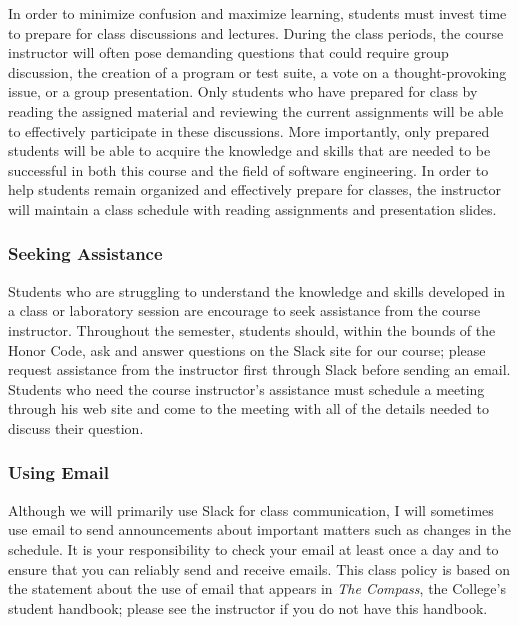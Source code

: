 \documentclass[11pt]{article}
\newcommand{\instructorpronoun}[1]{his}
\begin{document}
In order to minimize confusion and maximize learning, students must invest time to prepare for class discussions and
lectures. During the class periods, the course instructor will often pose demanding questions that could require group
discussion, the creation of a program or test suite, a vote on a thought-provoking issue, or a group presentation. Only
students who have prepared for class by reading the assigned material and reviewing the current assignments will be able
to effectively participate in these discussions. More importantly, only prepared students will be able to acquire the
knowledge and skills that are needed to be successful in both this course and the field of software engineering. In
order to help students remain organized and effectively prepare for classes, the instructor will maintain a class
schedule with reading assignments and presentation slides.

\subsubsection*{Seeking Assistance}

Students who are struggling to understand the knowledge and skills developed in a class or laboratory session are
encourage to seek assistance from the course instructor. Throughout the semester, students should, within the bounds of
the Honor Code, ask and answer questions on the Slack site for our course; please request assistance from the instructor
first through Slack before sending an email. Students who need the course instructor's assistance must schedule a
meeting through \instructorpronoun{} web site and come to the meeting with all of the details needed to discuss their
question.

\subsubsection*{Using Email}

Although we will primarily use Slack for class communication, I will sometimes use email to send announcements about
important matters such as changes in the schedule. It is your responsibility to check your email at least once a day and to
ensure that you can reliably send and receive emails. This class policy is based on the statement about the use of email that
appears in {\em The Compass}, the College's student handbook; please see the instructor if you do not have this
handbook.

\end{document}
